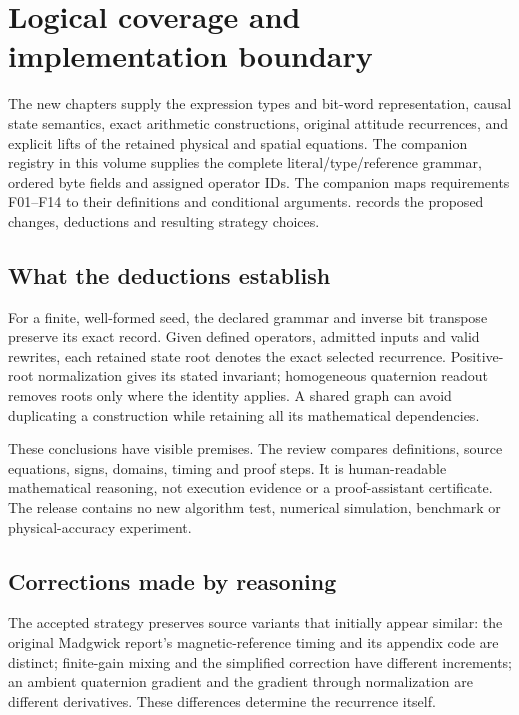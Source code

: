 \section{Logical coverage and implementation boundary}
\label{sec:exact-completion}
The new chapters supply the expression types and bit-word representation, causal
state semantics, exact arithmetic constructions, original attitude recurrences,
and explicit lifts of the retained physical and spatial equations. The companion
registry in this volume supplies the complete literal/type/reference grammar,
ordered byte fields and assigned operator IDs. The companion
 maps requirements F01--F14 to their
definitions and conditional arguments. 
records the proposed changes, deductions and resulting strategy choices.

\subsection{What the deductions establish}
For a finite, well-formed seed, the declared grammar and inverse bit transpose
preserve its exact record. Given defined operators, admitted inputs and valid
rewrites, each retained state root denotes the exact selected recurrence.
Positive-root normalization gives its stated invariant; homogeneous quaternion
readout removes roots only where the identity applies. A shared graph can avoid
duplicating a construction while retaining all its mathematical dependencies.

These conclusions have visible premises. The review compares definitions,
source equations, signs, domains, timing and proof steps. It is human-readable
mathematical reasoning, not execution evidence or a proof-assistant certificate.
The release contains no new algorithm test, numerical simulation, benchmark or
physical-accuracy experiment.

\subsection{Corrections made by reasoning}
The accepted strategy preserves source variants that initially appear similar:
the original Madgwick report's magnetic-reference timing and its appendix code
are distinct; finite-gain mixing and the simplified correction have different
increments; an ambient quaternion gradient and the gradient through normalization
are different derivatives. These differences determine the recurrence itself.

